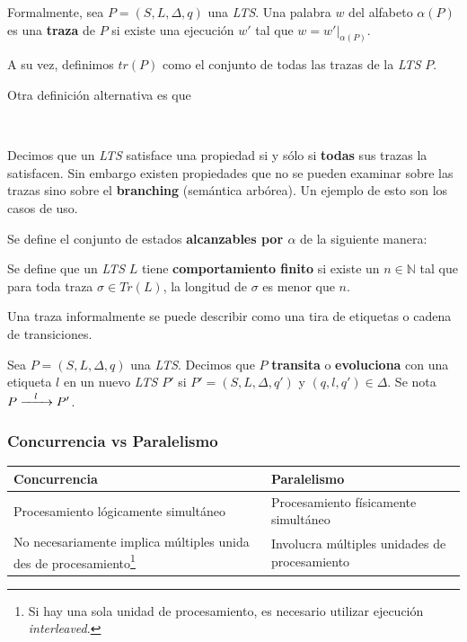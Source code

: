 \documentclass[]{article}
\begin{document}
Formalmente, sea $P = (S,L,\Delta,q)$ una \textit{LTS}. Una palabra $w$ del alfabeto $\alpha(P)$ es una \textbf{traza} de $P$ si existe una ejecución $w'$ tal que $\displaystyle w=w'|_{\alpha(P)}$.

A su vez, definimos $tr(P)$ como el conjunto de todas las trazas de la \textit{LTS} $P$.
\begin{center}
\end{center}

Otra definición alternativa es que
\begin{center}
	\\
\end{center}

Decimos que un \textit{LTS} satisface una propiedad si y sólo si \textbf{todas} sus trazas la satisfacen. Sin embargo existen propiedades que no se pueden examinar sobre las trazas sino sobre el \textbf{branching} (semántica arbórea). Un ejemplo de esto son los casos de uso.

Se define el conjunto de estados \textbf{alcanzables por $\alpha$} de la siguiente manera:
\begin{center}
\end{center}

Se define que un \textit{LTS} $L$ tiene \textbf{comportamiento finito} si existe un $n\in \mathbb{N}$ tal que para toda traza $\sigma \in Tr(L)$, la longitud de $\sigma$ es menor que $n$.

Una traza informalmente se puede describir como una tira de etiquetas o cadena de transiciones.

Sea $P = (S,L,\Delta,q)$ una \textit{LTS}. Decimos que $P$ \textbf{transita} o \textbf{evoluciona} con una etiqueta $l$ en un nuevo \textit{LTS} $P'$ si $P'=(S,L,\Delta,q')$ y $(q,l,q')\in\Delta$. Se nota $P \xrightarrow{\hspace*{0.3cm} l \hspace*{0.3cm}} P'$.


\subsubsection{Concurrencia vs Paralelismo}
\begin{savenotes}
\begin{center}
	\begin{tabular}{|p{6cm}|p{6cm}|}
		\hline
		\textbf{Concurrencia} &  \textbf{Paralelismo}\\ \hline \hline
		Procesamiento lógicamente simultáneo & Procesamiento físicamente simultáneo\\ \hline
		No necesariamente implica múltiples unida	des de procesamiento\footnote{Si hay una sola unidad de procesamiento, es necesario utilizar ejecución \textit{interleaved}.} & Involucra múltiples unidades de procesamiento\\ \hline
	\end{tabular}
\end{center}
\end{savenotes}
\end{document}
